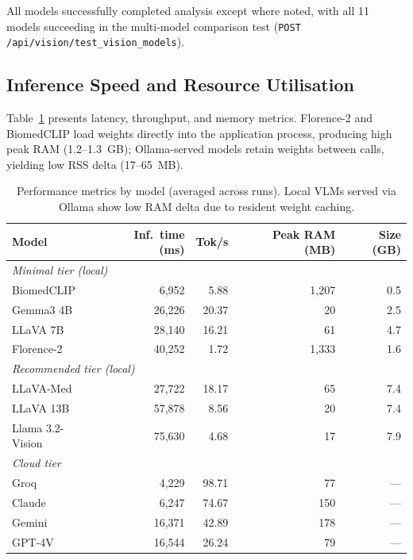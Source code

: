 \documentclass[12pt,a4paper]{report}
\begin{document}
	All models successfully completed analysis except where noted, with all 11 models succeeding in the multi-model comparison test (\texttt{POST /api/vision/test\_vision\_models}).
	
	
	
	\subsection{Inference Speed and Resource Utilisation}
	
	Table~\ref{tab:performance_metrics} presents latency, throughput, and memory
	metrics. Florence-2 and BiomedCLIP load weights directly into the application
	process, producing high peak RAM (1.2--1.3~GB); Ollama-served models retain
	weights between calls, yielding low RSS delta (17--65~MB).
	
	\begin{table}[H]
		\centering
		\caption{Performance metrics by model (averaged across runs). Local VLMs served
			via Ollama show low RAM delta due to resident weight caching.}
		\label{tab:performance_metrics}
		\small
		\renewcommand{\arraystretch}{1.2}
		\begin{tabularx}{\textwidth}{@{}l r r r r@{}}
			\toprule
			\textbf{Model} & \textbf{Inf.\ time (ms)} & \textbf{Tok/s} & \textbf{Peak RAM (MB)} & \textbf{Size (GB)} \\
			\midrule
			\multicolumn{5}{l}{\textit{Minimal tier (local)}} \\
			BiomedCLIP        &  6,952 &  5.88 & 1{,}207 & 0.5 \\
			Gemma3 4B         & 26,226 & 20.37 &      20 & 2.5 \\
			LLaVA 7B          & 28,140 & 16.21 &      61 & 4.7 \\
			Florence-2        & 40,252 &  1.72 & 1{,}333 & 1.6 \\
			\midrule
			\multicolumn{5}{l}{\textit{Recommended tier (local)}} \\
			LLaVA-Med         & 27,722 & 18.17 &      65 & 7.4 \\
			LLaVA 13B         & 57,878 &  8.56 &      20 & 7.4 \\
			Llama 3.2-Vision  & 75,630 &  4.68 &      17 & 7.9 \\
			\midrule
			\multicolumn{5}{l}{\textit{Cloud tier}} \\
			Groq              &  4,229 & 98.71 &      77 & ---   \\
			Claude            &  6,247 & 74.67 &     150 & ---   \\
			Gemini            & 16,371 & 42.89 &     178 & ---   \\
			GPT-4V            & 16,544 & 26.24 &      79 & ---   \\
			\bottomrule
		\end{tabularx}
	\end{table}
	
\end{document}
